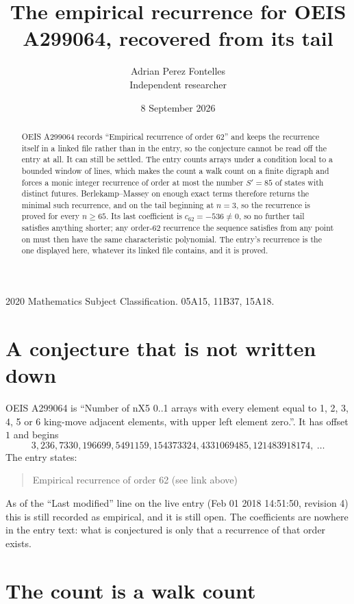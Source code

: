 \documentclass[11pt,a4paper]{article}
\title{The empirical recurrence for OEIS A299064, recovered from its tail}
\author{Adrian Perez Fontelles\\ \small Independent researcher}
\date{8 September 2026}
\theoremstyle{plain}
\theoremstyle{definition}
\begin{document}
\maketitle

\begin{abstract}
OEIS A299064 records ``Empirical recurrence of order $62$'' and keeps the recurrence itself in
a linked file rather than in the entry, so the conjecture cannot be read off the entry at all.
It can still be settled. The entry counts arrays under a condition local to a bounded window of
lines, which makes the count a walk count on a finite digraph and forces a monic integer
recurrence of order at most the number $S'=85$ of states with distinct futures. Berlekamp--Massey on
enough exact terms therefore returns the minimal such recurrence, and on the tail beginning at $n=3$, so the recurrence is proved for every $n\ge65$.
Its last coefficient is $c_{62}=-536\neq0$, so no further tail satisfies anything
shorter; any order-$62$ recurrence the sequence satisfies from any point on must then have
the same characteristic polynomial. The entry's recurrence is the one displayed here, whatever
its linked file contains, and it is proved.
\end{abstract}

\noindent\small 2020 Mathematics Subject Classification. 05A15, 11B37, 15A18.\normalsize

\section{A conjecture that is not written down}

OEIS A299064 is ``Number of nX5 0..1 arrays with every element equal to 1, 2, 3, 4, 5 or 6 king-move adjacent elements, with upper left element zero.''. It has offset $1$ and begins
\[
3, 236, 7330, 196699, 5491159, 154373324, 4331069485, 121483918174,\ \dots
\]
The entry states:
\begin{quote}
Empirical recurrence of order 62 (see link above)
\end{quote}
As of the ``Last modified'' line on the live entry (Feb 01 2018 14:51:50, revision 4)
this is still recorded as empirical, and it is still open. The coefficients are nowhere in the
entry text: what is conjectured is only that a recurrence of that order exists.

\section{The count is a walk count}
\end{document}
